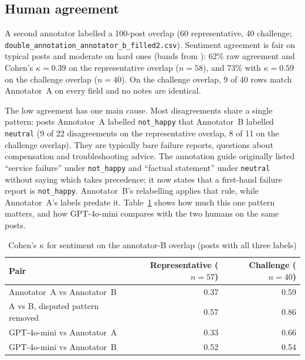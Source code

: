 \documentclass[11pt,a4paper]{article}
\begin{document}
\subsection{Human agreement}
\label{sec:agreement}

A second annotator labelled a 100-post overlap (60 representative, 40 challenge; \texttt{double\_annotation\_\allowbreak annotator\_b\_\allowbreak filled2.csv}). Sentiment agreement is fair on typical posts and moderate on hard ones (bands from \cite{landis1977kappa}): 62\% raw agreement and Cohen's $\kappa=0.39$ \cite{cohen1960kappa} on the representative overlap ($n=58$), and 73\% with $\kappa=0.59$ on the challenge overlap ($n=40$). On the challenge overlap, 9 of 40 rows match Annotator~A on every field and no notes are identical.

The low agreement has one main cause. Most disagreements share a single pattern: posts Annotator~A labelled \texttt{not\_happy} that Annotator~B labelled \texttt{neutral} (9 of 22 disagreements on the representative overlap, 8 of 11 on the challenge overlap). They are typically bare failure reports, questions about compensation and troubleshooting advice. The annotation guide originally listed ``service failure'' under \texttt{not\_happy} and ``factual statement'' under \texttt{neutral} without saying which takes precedence; it now states that a first-hand failure report is \texttt{not\_happy}. Annotator~B's relabelling applies that rule, while Annotator~A's labels predate it. Table~\ref{tab:agreement} shows how much this one pattern matters, and how GPT-4o-mini compares with the two humans on the same posts.

\begin{table}[H]
\centering
\caption{Cohen's $\kappa$ for sentiment on the annotator-B overlap (posts with all three labels)}
\label{tab:agreement}
\begin{tabular}{lrr}
\toprule
\textbf{Pair} & \textbf{Representative ($n=57$)} & \textbf{Challenge ($n=40$)} \\
\midrule
Annotator~A vs Annotator~B & 0.37 & 0.59 \\
A vs B, disputed pattern removed & 0.57 & 0.86 \\
GPT-4o-mini vs Annotator~A & 0.33 & 0.66 \\
GPT-4o-mini vs Annotator~B & 0.52 & 0.54 \\
\bottomrule
\end{tabular}
\end{table}
\end{document}
